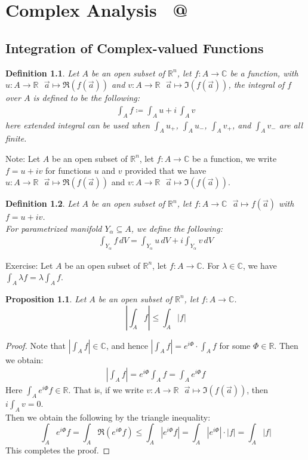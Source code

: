 \documentclass[11pt,oneside]{book}
\makeatletter
\theoremstyle{break}
\theoremstyle{break}
\newtheorem{prop}[lem]{Proposition}
\newtheorem{defn}{Definition}[corL]
\newcommand{\R}{\mathbb{R}}
\newcommand{\Complex}{\mathbb{C}}
\newcommand{\note}{\color{red}Note: \color{black}}
\newcommand{\exercise}{\color{green}Exercise: \color{black}}
\newcommand*{\rom}[1]{\expandafter\@slowromancap\romannumeral #1@}
\makeatother
\begin{document}
\newpage
\chapter{Complex Analysis \ \rom{1}}
\setcounter{section}{20}
\section[Integration of Complex-valued Functions]{\color{red}Integration of Complex-valued Functions\color{black}}
\begin{defn}
Let $A$ be an open subset of $\R^n$, let $f:A \to \Complex$ be a function, with $u:A \to \R\ \ \ \vec{a}\mapsto \Re(f(\vec{a}))$ and  $v:A\to \R \ \ \ \vec{a}\mapsto \Im(f(\vec{a}))$, the integral of $f$ over $A$ is defined to be the following:
\begin{align*}
\int_A f \coloneqq \int_A u + i\, \int_A v
\end{align*}
here extended integral can be used when $\int_A u_+$, $\int_A u_-$, $\int_A v_+$, and $\int_A v_-$ are all finite. 
\end{defn}

\note Let $A$ be an open subset of $\R^n$, let $f:A \to \Complex$ be a function, we write $f = u + iv$ for functions $u$ and $v$ provided that we have $u:A \to \R\ \ \ \vec{a}\mapsto \Re(f(\vec{a}))$ and  $v:A\to \R \ \ \ \vec{a}\mapsto \Im(f(\vec{a}))$. 

\begin{defn}
Let $A$ be an open subset of $\R^n$, let $f:A \to \Complex  \ \ \ \vec{a}\mapsto f(\vec{a})$ with $f = u+iv$. \\
For parametrized manifold $Y_\alpha \subseteq A$, we define the following:
\begin{align*}
\int_{Y_\alpha} f\, dV = \int_{Y_\alpha}u \, dV + i \int_{Y_\alpha} v \, dV
\end{align*}
\end{defn}

\exercise Let $A$ be an open subset of $\R^n$, let $f:A \to \Complex$. For $\lambda \in \Complex$, we have $\int_A \lambda f = \lambda \int_A f$.


\begin{prop}
Let $A$ be an open subset of $\R^n$, let $f:A \to \Complex$.
$$\left|\int_A f\right| \leq \int_A |f|$$
\end{prop}
\begin{proof}
Note that $|\int_A f|\in \Complex$, and hence $|\int_A f| = e^{i\Phi} \cdot \int_A f$ for some $\Phi \in \R$. Then we obtain:
\begin{align*}
\left| \int_A f\right| = e^{i\Phi} \int_A f = \int_A e^{i\Phi} f
\end{align*}
Here $\int_A e^{i\Phi} f \in \R$. That is, if we write $v:A \to \R \ \ \ \vec{a}\mapsto \Im(f(\vec{a}))$, then $i \int_A v = 0$. \\Then we obtain the following by the triangle inequality:
$$\int_A e^{i\Phi} f = \int_A \Re(e^{i\Phi} f) \leq \int_A |e^{i\Phi} f| = \int_A |e^{i\Phi}| \cdot |f| = \int_A |f|$$
This completes the proof.
\end{proof}
\end{document}
